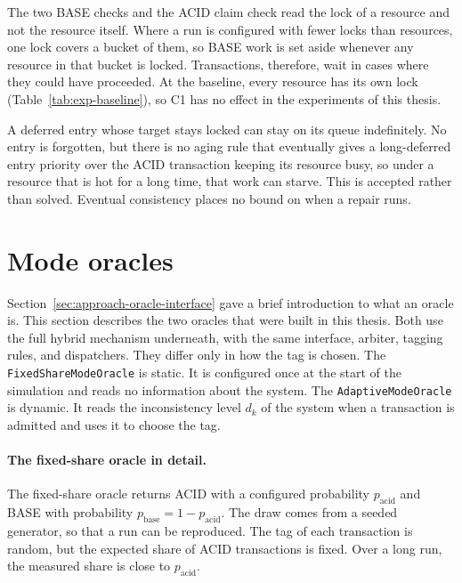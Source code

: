 \begin{bullets}
  \item[C1. Lock buckets hide free resources.] The two BASE checks and the
  ACID claim check read the lock of a resource and not the resource itself.
  Where a run is configured with fewer locks than resources, one lock
  covers a bucket of them, so BASE work is set aside whenever any
  resource in that bucket is locked. Transactions, therefore, wait in cases
  where they could have proceeded. At the baseline, every resource has its own
  lock (Table~\ref{tab:exp-baseline}), so C1 has no effect in the experiments
  of this thesis.

  \item[C2. Starvation of deferred work.] A deferred entry whose target
  stays locked can stay on its queue indefinitely. No entry is
  forgotten, but there is no aging rule that eventually gives a
  long-deferred entry priority over the ACID transaction keeping its
  resource busy, so under a resource that is hot for a long time,
  that work can starve. This is accepted rather than solved. Eventual
  consistency places no bound on when a repair runs.
\end{bullets}


\section{Mode oracles}\label{sec:approach-oracles}

Section~\ref{sec:approach-oracle-interface} gave a brief introduction to what an
oracle is. This section describes the two oracles that were built in this
thesis. Both use the full hybrid mechanism underneath, with the same interface,
arbiter, tagging rules, and dispatchers. They differ only in how the tag is
chosen. The \texttt{FixedShareModeOracle} is static. It is configured once at
the start of the simulation and reads no information about the system. The
\texttt{AdaptiveModeOracle} is dynamic. It reads the inconsistency level $d_k$
of the system when a transaction is admitted and uses it to choose the tag.

\paragraph{The fixed-share oracle in
  detail.}\label{sec:approach-fixed-share-oracle} The fixed-share oracle returns
ACID with a configured probability $p_{\mathrm{acid}}$ and BASE with probability
$p_{\mathrm{base}} = 1 - p_{\mathrm{acid}}$. The draw comes from a seeded
generator, so that a run can be reproduced. The tag of each transaction is
random, but the expected share of ACID transactions is fixed. Over a long run,
the measured share is close to $p_{\mathrm{acid}}$.

